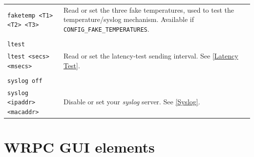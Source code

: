 \documentclass[a4paper, 12pt]{article}
\newcommand{\code}[1]{\texttt{#1}}
\begin{document}
\begin{longtable}{  p{7.5cm}  p{7cm} }
  \code{faketemp <T1> <T2> <T3>}  & Read or set the three fake temperatures, used to test the temperature/syslog mechanism. Available if \texttt{CONFIG\_FAKE\_TEMPERATURES}.\\
 & \\
  \code{ltest} & \\

  \code{ltest <secs> <msecs>} & Read or set the latency-test sending interval. See \ref{Latency Test}.\\
 & \\
  \code{syslog off} & \\

  \code{syslog <ipaddr> <macaddr>} & Disable or set your \textit{syslog} server. See \ref{Syslog}.\\

\end{longtable}



\clearpage
\section{WRPC GUI elements}
\label{WRPC GUI elements}
\end{document}
